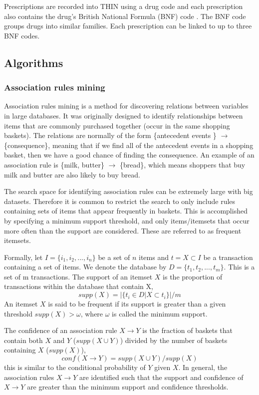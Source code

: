 \documentclass{llncs}
\begin{document}
Prescriptions are recorded into THIN using a drug code and each prescription also contains the drug's British National Formula (BNF) code \cite{BNF}. The BNF code groups drugs into similar families. Each prescription can be linked to up to three BNF codes. 

\subsection{Algorithms}
\subsubsection{Association rules mining}
Association rules mining \cite{Agrawal1993} is a method for discovering relations between variables in large databases. It was originally designed to identify relationships between items that are commonly purchased together (occur in the same shopping baskets). The relations are normally of the form \{antecedent events \} $\to$ \{consequence\}, meaning that if we find all of the antecedent events in a shopping basket, then we have a good chance of finding the consequence. An example of an association rule is \{milk, butter\} $\to$ \{bread\}, which means shoppers that buy milk and butter are also likely to buy bread. 

The search space for identifying association rules can be extremely large with big datasets. Therefore it is common to restrict the search to only include rules containing sets of items that appear frequently in baskets. This is accomplished by specifying a minimum support threshold, and only items/itemsets that occur more often than the support are considered. These are referred to as frequent itemsets.

Formally, let $I = \{i_{1}, i_{2},..., i_{n}\}$ be a set of $n$ items and $t = X \subset I$ be a transaction containing a set of items. We denote the database by $D = \{ t_{1}, t_{2},..., t_{m}\}$. This is a set of m transactions. The support of an itemset $X$ is the proportion of transactions within the database that contain X,
\begin{equation}
supp(X) = |\{ t_{i} \in D | X \subset t_{i} \} |/m
\end{equation}
An itemset $X$ is said to be frequent if its support is greater than a given threshold $supp(X)>\omega$, where $\omega$ is called the minimum support. 

The confidence of an association rule $X \to Y$ is the fraction of baskets that contain both $X$ and $Y$ ($supp(X \cup Y)$) divided by the number of baskets containing $X$ ($supp(X)$),
\begin{equation}
conf(X \to Y) = supp(X \cup Y)/supp(X)
\end{equation}
this is similar to the conditional probability of $Y$ given $X$. In general, the association rules $X \to Y$ are identified such that the support and confidence of $X \to Y$ are greater than the minimum support and confidence thresholds.
\end{document}
